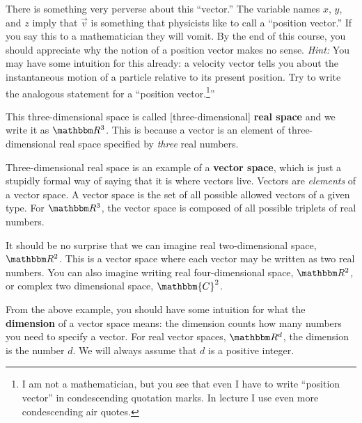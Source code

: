 \documentclass[12pt, oneside]{report}    %
\begin{document}
\begin{exercise}
There is something very perverse about this ``vector.'' The variable names $x$, $y$, and $z$ imply that $\vec{v}$ is something that physicists like to call a ``position vector.'' If you say this to a mathematician they will vomit. By the end of this course, you should appreciate why the notion of a position vector makes no sense. \emph{Hint:} You may have some intuition for this already: a velocity vector tells you about the instantaneous motion of a particle relative to its present position. Try to write the analogous statement for a ``position vector.\footnote{I am not a mathematician, but you see that even I have to write ``position vector'' in condescending quotation marks. In lecture I use even more condescending air quotes.}''
\label{ex:position:vector}
\end{exercise}

This three-dimensional space is called [three-dimensional] \textbf{real space} and we write it as $\RR ^3$. This is because a vector is an element of three-dimensional real space specified by \emph{three} real numbers. 

Three-dimensional real space is an example of a \textbf{vector space}, which is just a stupidly formal way of saying that it is where vectors live. Vectors are \emph{elements} of a vector space. A vector space is the set of all possible allowed vectors of a given type. For $\RR ^3$, the vector space is composed of all possible triplets of real numbers. 


\begin{example} It should be no surprise that we can imagine real two-dimensional space, $\RR ^2$. This is a vector space where each vector may be written as two real numbers. You can also imagine writing real four-dimensional space, $\RR ^2$, or complex two dimensional space, $\mathbbm{C}^2$. 
\end{example}

From the above example, you should have some intuition for what the \textbf{dimension} of a vector space means: the dimension counts how many numbers you need to specify a vector. For real vector spaces, $\RR ^d$, the dimension is the number $d$. We will always assume that $d$ is a positive integer.
\end{document}

